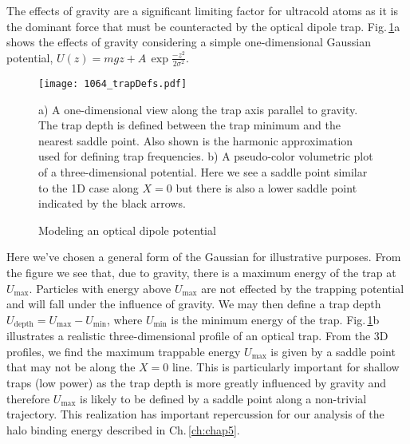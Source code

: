 The effects of gravity are a significant limiting factor for ultracold atoms as it is the dominant force that must be counteracted by the optical dipole trap.
Fig.\,\ref{fig:trapDepth}a shows the effects of gravity considering a simple one-dimensional Gaussian potential, $U(z) = mgz + A\,\exp{\frac{-z^2}{2\sigma^2}}$.
	\begin{figure} 
		\centerline{
		\texttt{[image: 1064\_trapDefs.pdf]}}
		\caption{Modeling an optical dipole potential}{a) A one-dimensional view along the trap axis parallel to gravity. The trap depth is defined between the trap minimum and the nearest saddle point. Also shown is the harmonic approximation used for defining trap frequencies. b) A pseudo-color volumetric plot of a three-dimensional potential. Here we see a saddle point similar to the 1D case along $X=0$ but there is also a lower saddle point indicated by the black arrows.}
		\label{fig:trapDepth}
	\end{figure}
Here we've chosen a general form of the Gaussian for illustrative purposes.
From the figure we see that, due to gravity, there is a maximum energy of the trap at $U_{\text{max}}$.
Particles with energy above $U_{\text{max}}$ are not effected by the trapping potential and will fall under the influence of gravity.
We may then define a trap depth $U_{\text{depth}} = U_{\text{max}} - U_{\text{min}}$, where $U_{\text{min}}$ is the minimum energy of the trap.
Fig.\,\ref{fig:trapDepth}b illustrates a realistic three-dimensional profile of an optical trap.
From the 3D profiles, we find the maximum trappable energy $U_{\text{max}}$ is given by a saddle point that may not be along the $X=0$ line.
This is particularly important for shallow traps (low power) as the trap depth is more greatly influenced by gravity and therefore $U_{\text{max}}$ is likely to be defined by a saddle point along a non-trivial trajectory.
This realization has important repercussion for our analysis of the halo binding energy described in Ch.\,\ref{ch:chap5}.


